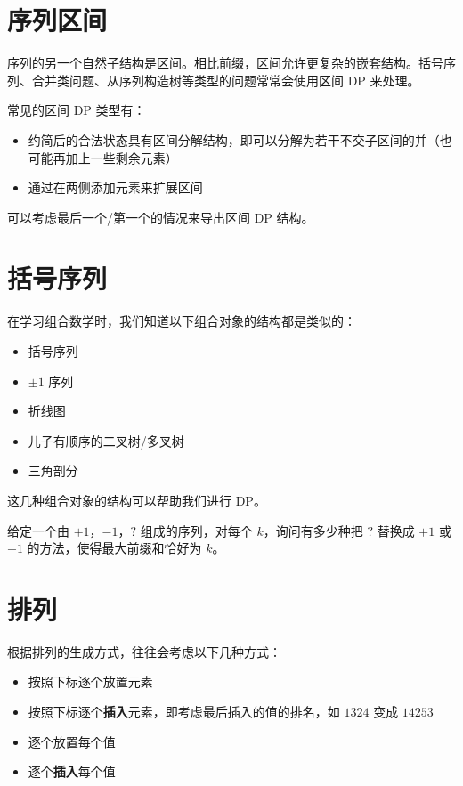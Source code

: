 \section{序列区间}

序列的另一个自然子结构是区间。相比前缀，区间允许更复杂的嵌套结构。括号序列、合并类问题、从序列构造树等类型的问题常常会使用区间 DP 来处理。

常见的区间 DP 类型有：
\begin{itemize}
    \item 约简后的合法状态具有区间分解结构，即可以分解为若干不交子区间的并（也可能再加上一些剩余元素）
    \item 通过在两侧添加元素来扩展区间
\end{itemize}

可以考虑最后一个/第一个的情况来导出区间 DP 结构。

\begin{example}[{[NOI1995] 石子合并}]
    
\end{example}

\section{括号序列}

在学习组合数学时，我们知道以下组合对象的结构都是类似的：
\begin{itemize}
    \item 括号序列
    \item $\pm 1$ 序列
    \item 折线图
    \item 儿子有顺序的二叉树/多叉树
    \item 三角剖分
\end{itemize}

这几种组合对象的结构可以帮助我们进行 DP。

\begin{example}
    给定一个由 $+1$，$-1$，$?$ 组成的序列，对每个 $k$，询问有多少种把 $?$ 替换成 $+1$ 或 $-1$ 的方法，使得最大前缀和恰好为 $k$。
\end{example}

\section{排列}

根据排列的生成方式，往往会考虑以下几种方式：

\begin{itemize}
    \item 按照下标逐个放置元素
    \item 按照下标逐个\textbf{插入}元素，即考虑最后插入的值的排名，如 $1324$ 变成 $14253$
    \item 逐个放置每个值
    \item 逐个\textbf{插入}每个值
\end{itemize}

